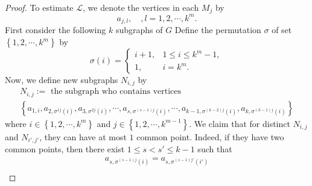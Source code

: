 \begin{proof}
To estimate  $\mathcal{L}$, we denote the vertices in each $M_j$ by 
\[
a_{j,l},\quad, l=1,2,\cdots ,k^{m}. 
\]
First consider the following $k$ subgraphs of $G$
Define the permutation $\sigma$ of set $\left\{1,2,\cdots ,k^{m}\right\} $ by
\begin{equation}
	\sigma(i)=\begin{cases}
		i+1,& 1\le i\le k^{m}-1,\\
		1,& i=k^{m}.
	\end{cases}
\end{equation}
Now, we define new subgraphs $N_{i,j}$ by
\begin{equation*}
	\begin{aligned}
		&N_{i,j}:= \text{ the subgraph who contains vertices }&\\
						    &\left\{a_{1,i},a_{2,\sigma^{1j}(i)}, a_{3,\sigma^{2j}(i)},\cdots,a_{s,\sigma^{(s-1)j}(i)},\cdots,a_{k-1,\sigma^{(k-2)j}(i)},a_{k,\sigma^{(k-1)j}(i)}\right\}&
	\end{aligned}
\end{equation*}
where $i \in \left\{1,2,\cdots ,k^{m}\right\} $ and $j \in \left\{1,2,\cdots ,k^{m-1}\right\} $. We claim that for distinct $N_{i,j}$ and $N_{i',j'}$, they can have at most $1$ common point. Indeed, if they have two common points, then there exist $1\le s<s'\le k-1$ such that
\begin{equation*}
	\begin{aligned}
		a_{s,\sigma^{(s-1)j}(i)}=a_{s,\sigma^{(s-1)j'}(i')}\\

\end{aligned}
\end{equation*}
\end{proof}
